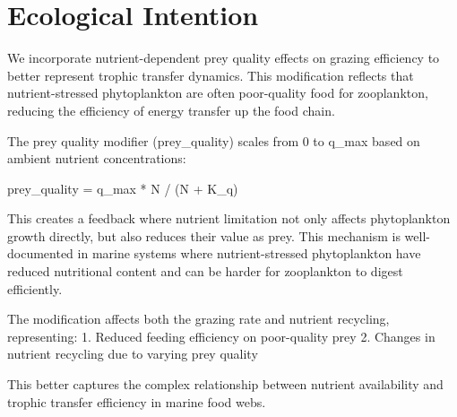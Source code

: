 \section{Ecological Intention}

We incorporate nutrient-dependent prey quality effects on grazing efficiency to better represent trophic transfer dynamics. This modification reflects that nutrient-stressed phytoplankton are often poor-quality food for zooplankton, reducing the efficiency of energy transfer up the food chain.

The prey quality modifier (prey\_quality) scales from 0 to q\_max based on ambient nutrient concentrations:

prey\_quality = q\_max * N / (N + K\_q)

This creates a feedback where nutrient limitation not only affects phytoplankton growth directly, but also reduces their value as prey. This mechanism is well-documented in marine systems where nutrient-stressed phytoplankton have reduced nutritional content and can be harder for zooplankton to digest efficiently.

The modification affects both the grazing rate and nutrient recycling, representing:
1. Reduced feeding efficiency on poor-quality prey
2. Changes in nutrient recycling due to varying prey quality

This better captures the complex relationship between nutrient availability and trophic transfer efficiency in marine food webs.
